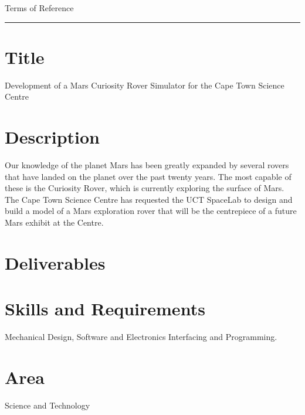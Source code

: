 {\Large Terms of Reference}\\
\hrule

\section*{Title}
  Development of a Mars Curiosity Rover Simulator for the Cape Town Science Centre
\section*{Description}
  Our knowledge of the planet Mars has been greatly expanded by several rovers that have landed on the planet over the past twenty years. The most capable of these is the Curiosity Rover, which is currently exploring the surface of Mars. The Cape Town Science Centre has requested the UCT SpaceLab to design and build a model of a Mars exploration rover that will be the centrepiece of a future Mars exhibit at the Centre.
  
\section*{Deliverables}
  
\section*{Skills and Requirements}
  Mechanical Design, Software and Electronics Interfacing and Programming.
  
\section*{Area}
  Science and Technology
